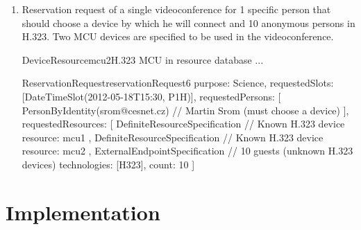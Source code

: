 \begin{enumerate}
\begin{EntityExample}{DeviceResource}{terminal2}{H.323 terminal in resource database}
...
\end{EntityExample}

\begin{EntityExample}{DeviceResource}{terminal3}{Another H.323 terminal in resource database}
...
\end{EntityExample}

\begin{EntityExample}{ReservationRequest}{reservationRequest5}{}
purpose: Science,
requestedSlots: [DateTimeSlot(2012-05-18T15:30, P1H)],
requestedResources: [
  VirtualRoomSpecification {
    device: mcu1,
    size: 4
  },
  DefiniteResourceSpecification { // Known H.323 device
    resource: terminal2
  },
  DefiniteResourceSpecification { // Known H.323 device
    resource: terminal3
  }
]
\end{EntityExample}

\item Reservation request of a single videoconference for 1 specific person that should choose a device by which he will connect and 10 anonymous persons in H.323. Two MCU devices are specified to be used in the videoconference.


\begin{EntityExample}{DeviceResource}{mcu2}{H.323 MCU in resource database}
...
\end{EntityExample}

\begin{EntityExample}{ReservationRequest}{reservationRequest6}{}
purpose: Science,
requestedSlots: [DateTimeSlot(2012-05-18T15:30, P1H)],
requestedPersons: [
  PersonByIdentity(srom@cesnet.cz) // Martin Srom (must choose a device)
],
requestedResources: [
  DefiniteResourceSpecification { // Known H.323 device
    resource: mcu1
  },
  DefiniteResourceSpecification { // Known H.323 device
    resource: mcu2
  },
  ExternalEndpointSpecification { // 10 guests (unknown H.323 devices)
    technologies: [H323],
    count: 10
  }
]
\end{EntityExample}

\end{enumerate}


\section{Implementation}

